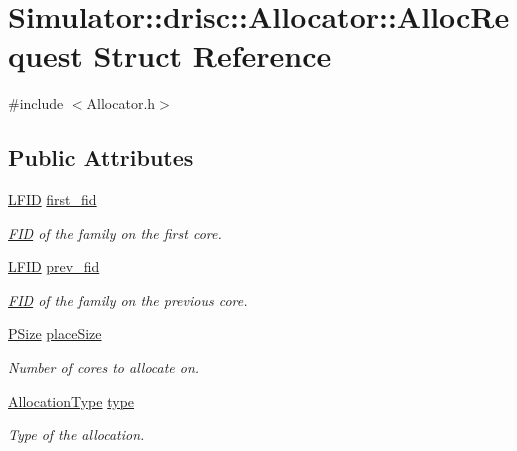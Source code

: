 \hypertarget{struct_simulator_1_1drisc_1_1_allocator_1_1_alloc_request}{\section{Simulator\+:\+:drisc\+:\+:Allocator\+:\+:Alloc\+Request Struct Reference}
\label{struct_simulator_1_1drisc_1_1_allocator_1_1_alloc_request}
}


{\ttfamily \#include $<$Allocator.\+h$>$}

\subsection*{Public Attributes}
\begin{DoxyCompactItemize}
\item 
\hyperlink{namespace_simulator_aaccbc706b2d6c99085f52f6dfc2333e4}{L\+F\+I\+D} \hyperlink{struct_simulator_1_1drisc_1_1_allocator_1_1_alloc_request_a1957c8a6218a2bb4c7ac3aaf191d92d3}{first\+\_\+fid}
\begin{DoxyCompactList}\small\item\em \hyperlink{struct_simulator_1_1_f_i_d}{F\+I\+D} of the family on the first core. \end{DoxyCompactList}\item 
\hyperlink{namespace_simulator_aaccbc706b2d6c99085f52f6dfc2333e4}{L\+F\+I\+D} \hyperlink{struct_simulator_1_1drisc_1_1_allocator_1_1_alloc_request_a5a56c365cbf29936ac19b7c188856eab}{prev\+\_\+fid}
\begin{DoxyCompactList}\small\item\em \hyperlink{struct_simulator_1_1_f_i_d}{F\+I\+D} of the family on the previous core. \end{DoxyCompactList}\item 
\hyperlink{namespace_simulator_a4aa07bee2f34beac11abf48a8ccc47c4}{P\+Size} \hyperlink{struct_simulator_1_1drisc_1_1_allocator_1_1_alloc_request_a1f6cc515ec7348788603310ab32ff47b}{place\+Size}
\begin{DoxyCompactList}\small\item\em Number of cores to allocate on. \end{DoxyCompactList}\item 
\hyperlink{namespace_simulator_a5c7d556007e11ed2e93f9fe53c60128b}{Allocation\+Type} \hyperlink{struct_simulator_1_1drisc_1_1_allocator_1_1_alloc_request_a627f11c7a81aaf352cf2414886b9fda9}{type}
\begin{DoxyCompactList}\small\item\em Type of the allocation. \end{DoxyCompactList}\item 

\end{DoxyCompactItemize}
